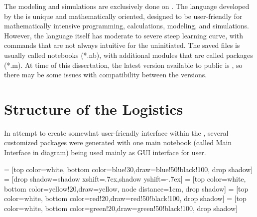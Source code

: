 The modeling and simulations are exclusively done on .  The language developed by the \MathLogo is unique and mathematically oriented, designed to be user-friendly for mathematically intensive programming, calculations, modeling, and simulations.  However, the language itself has moderate to severe steep learning curve, with commands that are not always intuitive for the uninitiated.  The saved \MathLogo files  is usually called notebooks (*.nb), with additional modules that are called packages (*.m).  At time of this dissertation, the latest version available to public is , so there may be some issues with compatibility between the versions.

\section{Structure of the Logistics}

In attempt to create somewhat user-friendly interface within the , several customized packages were generated with one main notebook (called Main Interface in diagram) being used mainly as GUI interface for user.

\usetikzlibrary{positioning}
\usetikzlibrary{shadows}

 = [top color=white, bottom color=blue!30,draw=blue!50!black!100, drop shadow]
 = [drop shadow={shadow xshift=.7ex,shadow yshift=-.7ex}]
 = [top color=white, bottom color=yellow!20,draw=yellow, node distance=1cm, drop shadow]
 = [top color=white, bottom color=red!20,draw=red!50!black!100, drop shadow]
 = [top color=white, bottom color=green!20,draw=green!50!black!100, drop shadow]




